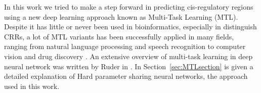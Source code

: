 In this work we tried to make a step forward in predicting cis-regulatory
regions using a new deep learning approach known as Multi-Task Learning
(MTL). Despite it has little or never been used in bioinformatics,
especially in distinguish CRRs, a lot of MTL variants has been successfully applied in many
fields, ranging from natural language processing \cite{CollobertWeston2008} and speech recognition \cite{Deng2013} to computer vision \cite{Girshick2015} and drug discovery \cite{Ramsundar2015}. An extensive overview of multi-task learning in deep neural network was written by Ruder in \cite{Ruder2017}. In Section~\ref{sec:MTLsection} is given a detailed explanation of Hard parameter sharing neural networks, the approach used in this work.